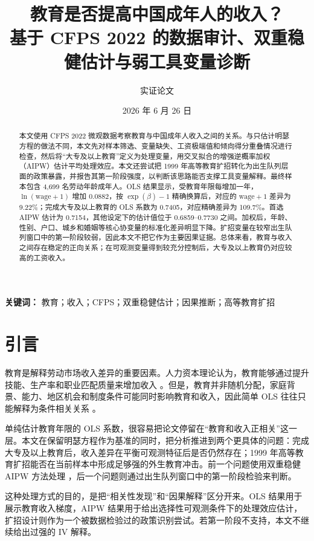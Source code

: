 \documentclass[UTF8,12pt]{ctexart}
\title{教育是否提高中国成年人的收入？\\基于 CFPS 2022 的数据审计、双重稳健估计与弱工具变量诊断}
\author{实证论文}
\date{2026 年 6 月 26 日}
\begin{document}
\maketitle

\begin{abstract}
本文使用 CFPS 2022 微观数据考察教育与中国成年人收入之间的关系。与只估计明瑟方程的做法不同，本文先对样本筛选、变量缺失、工资极端值和倾向得分重叠情况进行检查，然后将“大专及以上教育”定义为处理变量，用交叉拟合的增强逆概率加权（AIPW）估计平均处理效应。本文还尝试把 1999 年高等教育扩招转化为出生队列层面的政策暴露，并报告其第一阶段强度，以判断该思路能否支撑工具变量解释。最终样本包含 4,699 名劳动年龄成年人。OLS 结果显示，受教育年限每增加一年，$\ln(\mathrm{wage}+1)$ 增加 0.0882，按 $\exp(\beta)-1$ 精确换算后，对应的 $\mathrm{wage}+1$ 差异为 9.22\%；完成大专及以上教育的 OLS 系数为 0.7405，对应精确差异为 109.7\%。首选 AIPW 估计为 0.7154，其他设定下的估计值位于 0.6859--0.7730 之间。加权后，年龄、性别、户口、城乡和婚姻等核心协变量的标准化差异明显下降。扩招变量在较窄出生队列窗口中的第一阶段较弱，因此本文不把它作为主要因果证据。总体来看，教育与收入之间存在稳定的正向关系；在可观测变量得到较充分控制后，大专及以上教育仍对应较高的工资收入。
\end{abstract}

\noindent\textbf{关键词：} 教育；收入；CFPS；双重稳健估计；因果推断；高等教育扩招

\section{引言}

教育是解释劳动市场收入差异的重要因素。人力资本理论认为，教育能够通过提升技能、生产率和职业匹配质量来增加收入 \citep{becker1964human, mincer1974schooling}。但是，教育并非随机分配，家庭背景、能力、地区机会和制度条件可能同时影响教育和收入，因此简单 OLS 往往只能解释为条件相关关系 \citep{card1999causal, heckman2008earnings}。

单纯估计教育年限的 OLS 系数，很容易把论文停留在“教育和收入正相关”这一层。本文在保留明瑟方程作为基准的同时，把分析推进到两个更具体的问题：完成大专及以上教育后，收入差异在平衡可观测特征后是否仍然存在；1999 年高等教育扩招能否在当前样本中形成足够强的外生教育冲击。前一个问题使用双重稳健 AIPW 方法处理 \citep{hirano2003efficient, bang2005doubly}，后一个问题则通过出生队列窗口中的第一阶段检验来判断。

这种处理方式的目的，是把“相关性发现”和“因果解释”区分开来。OLS 结果用于展示教育收入梯度，AIPW 结果用于给出选择性可观测条件下的处理效应估计，扩招设计则作为一个被数据检验过的政策识别尝试。若第一阶段不支持，本文不继续给出过强的 IV 解释。
\end{document}
